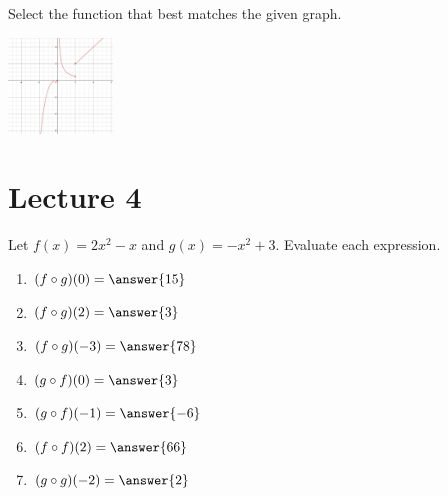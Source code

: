 \documentclass{ximera}
\begin{document}
\begin{problem}\label{prob:160hom2prob5}
Select the function that best matches the given graph.
\begin{image}
   \includegraphics[height=1in]{160H2pic7.jpg}
 \end{image}
\begin{multipleChoice}  
\end{multipleChoice}  

\end{problem}
\section{Lecture 4}
\begin{problem}\label{prob:160hom2prob6}
Let $f(x)=2x^2-x$ and $g(x)=-x^2+3$.  Evaluate each expression.
\begin{enumerate}
    \item $(f\circ g)(0)=\answer{15}$
    \item $(f\circ g)(2)=\answer{3}$
    \item $(f\circ g)(-3)=\answer{78}$
    \item $(g\circ f)(0)=\answer{3}$
    \item $(g\circ f)(-1)=\answer{-6}$
    \item $(f\circ f)(2)=\answer{66}$
    \item $(g\circ g)(-2)=\answer{2}$
\end{enumerate}
\end{problem}
\end{document}
